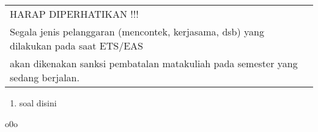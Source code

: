 \documentclass[11pt,letterpaper]{article}
\begin{document}
\begin{table}[h!]
\begin{tabular}{r c}
          \\ \hline
          \multicolumn{2}{|l|}{\color{red}\MakeUppercase{harap diperhatikan !!!}}                                                                                                           \\
          \multicolumn{2}{|l|}{\color{red}Segala jenis pelanggaran (mencontek, kerjasama, dsb) yang dilakukan pada saat ETS/EAS}                                                            \\
          \multicolumn{2}{|l|}{\color{red}akan dikenakan sanksi pembatalan matakuliah pada semester yang sedang berjalan.}                                                                  \\
          \hline
     \end{tabular}
\end{table}

\begin{enumerate}
     \item soal disini
\end{enumerate}
\vspace*{0.5cm}
\begin{center}
     \raisebox{.5ex}{\rule{0.5cm}{.4pt}}o0o\raisebox{.5ex}{\rule{0.5cm}{.4pt}}
\end{center}
\end{document}
